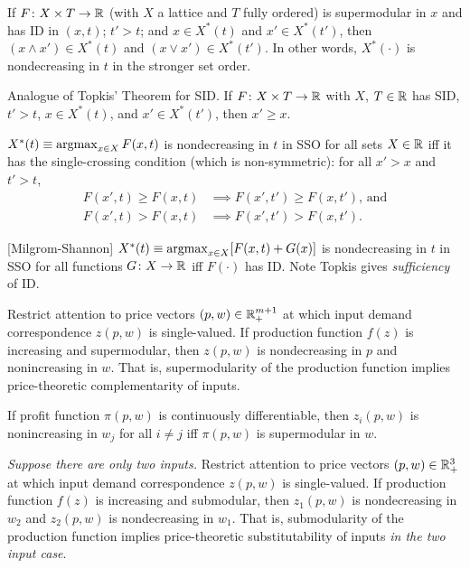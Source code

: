 \documentclass[8pt,letterpaper, landscape]{extarticle} %
\begin{document}
\begin{multicols}{3}
\begin{description}
If $ F \colon X \times T \to \mathbb{R} $ (with $ X $ a lattice and $ T $ fully ordered) is supermodular in $ x $ and has ID in $ (x,t) $; $ t' > t $; and $ x \in X^*(t) $ and $ x' \in X^* (t') $, then $ (x \wedge x') \in X^*(t) $ and $ (x \vee x') \in X^* (t') $. In other words, $ X^* (\cdot) $ is nondecreasing in $ t $ in the stronger set order.

 Analogue of Topkis' Theorem for SID. If $ F \colon X \times T \to \mathbb{R} $ with $ X $, $ T \in \mathbb{R} $ has SID, $ t' > t $, $ x \in X^*(t) $, and $ x' \in X^* (t') $, then $ x' \geq x $.

 $ X^*(t) \equiv \operatorname*{argmax}_{x \in X} F(x,t) $ is nondecreasing in $ t $ in SSO for all sets $ X \in \mathbb{R} $ iff it has the single-crossing condition (which is non-symmetric): for all $ x' > x $ and $ t' > t $,
\begin{align*}
F(x',t) \geq F(x,t) &\implies F(x',t') \geq F (x,t'), \, \text{and} \\
F(x',t) > F(x,t) &\implies F(x',t') > F (x,t').
\end{align*}

 [Milgrom-Shannon] $ X^*(t) \equiv \operatorname*{argmax}_{x \in X} [F(x,t) + G(x)] $ is nondecreasing in $ t $ in SSO for all functions $ G \colon X \to \mathbb{R} $ iff $ F(\cdot) $ has ID. Note Topkis gives \textit{sufficiency} of ID.

 Restrict attention to price vectors $ (p,w) \in \mathbb{R}_+^{m+1} $ at which input demand correspondence $ z(p,w) $ is single-valued. If production function $ f(z) $ is increasing and supermodular, then $ z(p,w) $ is nondecreasing in $ p $ and nonincreasing in $ w $. That is, supermodularity of the production function implies price-theoretic complementarity of inputs.

If profit function $ \pi (p,w) $ is continuously differentiable, then $ z_i(p, w) $ is nonincreasing in $ w_j $ for all $ i \neq j $ iff $ \pi(p,w) $ is supermodular in $ w $.

 \textit{Suppose there are only two inputs.} Restrict attention to price vectors $ (p,w) \in \mathbb{R}_+^3 $ at which input demand correspondence $ z(p,w) $ is single-valued. If production function $ f(z) $ is increasing and submodular, then $ z_1(p,w) $ is nondecreasing in $ w_2 $ and $ z_2(p,w) $ is nondecreasing in $ w_1 $. That is, submodularity of the production function implies price-theoretic substitutability of inputs \textit{in the two input case}.


\end{description}
\end{multicols}
\end{document}
